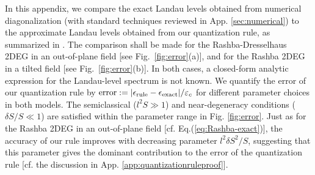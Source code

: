 \documentclass[aps, showpacs, twocolumn, notitlepage, superscriptaddress]{revtex4-1}
\begin{document}
In this appendix, we compare the exact Landau levels obtained from numerical diagonalization (with standard techniques reviewed in App. \ref{sec:numerical}) to the approximate Landau levels obtained from our quantization rule, as summarized in . The comparison shall be made for the Rashba-Dresselhaus 2DEG in an out-of-plane field [see Fig.\ \ref{fig:error}(a)], and for the Rashba 2DEG in a tilted field [see Fig.\ \ref{fig:error}(b)]. In both cases, a closed-form analytic expression for the Landau-level spectrum is not known. We quantify the error of our quantization rule by $\text{error}:=|\epsilon_\text{rule}-\epsilon_\text{exact}|/\varepsilon_c$ for different parameter choices in both models. The semiclassical ($l^2 S\gg 1$) and near-degeneracy conditions ($\delta S/S\ll 1$) are satisfied within the parameter range in Fig. \ref{fig:error}. Just as for the Rashba 2DEG in an out-of-plane field [cf. Eq.(\ref{eq:Rashba-exact})], the accuracy of our rule improves with decreasing parameter $l^2\delta S^2/S$,  suggesting that this parameter gives the dominant contribution to the error of the quantization rule [cf. the discussion in App. \ref{app:quantizationruleproof}].


\end{document}
